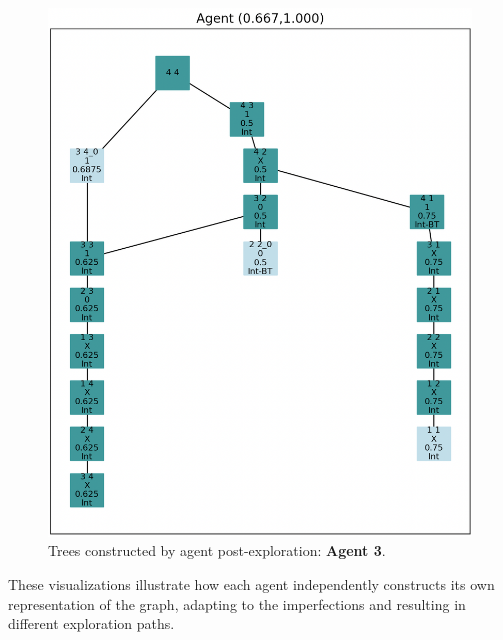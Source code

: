 \begin{figure}[H]
\centering
\includegraphics[width=1\textwidth]{Cap2/agent_3.png}
\caption{Trees constructed by agent post-exploration: \textbf{Agent 3}.}
\label{fig_agent_3_tree}
\end{figure}
    
These visualizations illustrate how each agent independently constructs its own representation of the graph,
adapting to the imperfections and resulting in different exploration paths.